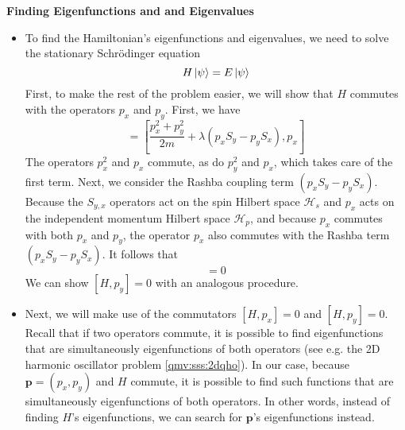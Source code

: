 \documentclass[11pt, a4paper]{article}
\newcommand{\schro}{Schr\"{o}dinger\xspace}
\renewcommand{\vec}[1]{\bm{#1}} %
\renewcommand{\H}{\mathcal{H}}  %
\begin{document}
\textbf{Finding Eigenfunctions and and Eigenvalues}
\begin{itemize}
	
	\item To find the Hamiltonian's eigenfunctions and eigenvalues, we need to solve the stationary \schro equation
	\begin{equation*}
		H \ket{\psi} = E \ket{\psi}
	\end{equation*}
	First, to make the rest of the problem easier, we will show that $ H $ commutes with the operators $ p_{x} $ and $ p_{y} $. First, we have
	\begin{equation*}
		[H, p_{x}] = \left[\frac{p_{x}^{2} + p_{y}^{2}}{2m} + \lambda (p_{x}S_{y} - p_{y}S_{x}), p_{x}\right]
	\end{equation*}
	The operators $ p_{x}^{2} $ and $ p_{x} $ commute, as do $ p_{y}^{2} $ and $ p_{x} $, which takes care of the first term. Next, we consider the Rashba coupling term $ (p_{x}S_{y} - p_{y}S_{x}) $. Because the $ S_{y, x} $ operators act on the spin Hilbert space $ \H_{s} $ and $ p_{x} $ acts on the independent momentum Hilbert space $ \H_{p} $, and because $ p_{x} $ commutes with both $ p_{x} $ and $ p_{y}$, the operator $ p_{x} $ also commutes with the Rashba term $ (p_{x}S_{y} - p_{y}S_{x}) $. It follows that
	\begin{equation*}
		[H, p_{x}] = 0
	\end{equation*}
	We can show $ [H, p_{y}] = 0 $ with an analogous procedure.
	
	\item Next, we will make use of the commutators $ [H, p_{x}] = 0  $ and $ [H, p_{y}] = 0  $. Recall that if two operators commute, it is possible to find eigenfunctions that are simultaneously eigenfunctions of both operators (see e.g. the 2D harmonic oscillator problem \ref{qmv:sss:2dqho}). In our case, because $ \vec{p} = (p_{x}, p_{y})$ and $ H $ commute, it is possible to find such functions that are simultaneously eigenfunctions of both operators. In other words, instead of finding $ H $'s eigenfunctions, we can search for $ \vec{p} $'s eigenfunctions instead. 
	

\end{itemize}
\end{document}
